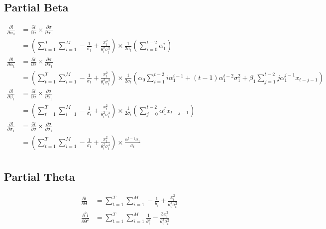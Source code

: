 \documentclass[a4paper, 12pts]{article}
\begin{document}
\subsection{Partial Beta}

\begin{align*}
  \frac{\partial{l}}{\partial{\alpha_0}} &=
  \frac{\partial{l}}{\partial{\sigma}} \times
  \frac{\partial{\sigma}}{\partial{\alpha_0}}\\
  &= \left(\sum_{t = 1}^T \sum_{i = 1}^M -\frac{1}{\sigma_t} +
    \frac{x_t^2}{\theta_i^2 \sigma_t^3}\right) \times
  \frac{1}{2\sigma_t}\left( \sum_{i = 0}^{t-2} \alpha_1^i \right)\\
  \frac{\partial{l}}{\partial{\alpha_1}} &=
  \frac{\partial{l}}{\partial{\sigma}} \times
  \frac{\partial{\sigma}}{\partial{\alpha_1}}\\
  &= \left(\sum_{t = 1}^T \sum_{i = 1}^M -\frac{1}{\sigma_t} +
    \frac{x_t^2}{\theta_i^2 \sigma_t^3}\right) \times
  \frac{1}{2\sigma_t} \left( \alpha_0 \sum_{i = 1}^{t - 2}
    i\alpha_1^{i -1} + (t - 1)\alpha_1^{t - 2} \sigma_1^2 + \beta_1
    \sum_{j = 1}^{t - 2} j \alpha_1^{j - 1} x_{t - j - 1}\right)\\
  \frac{\partial l}{\partial \beta_1} &= \frac{\partial l}{\partial
    \sigma} \times \frac{\partial \sigma}{\partial \beta_1}\\
  &= \left(\sum_{t = 1}^T \sum_{i = 1}^M -\frac{1}{\sigma_t} +
    \frac{x_t^2}{\theta_i^2 \sigma_t^3}\right)\times
  \frac{1}{2\sigma_t} \left(\sum_{j = 0}^{t - 2}
    \alpha_1^j x_{t - j - 1} \right)\\
  \frac{\partial l}{\partial \sigma_1} &= \frac{\partial l}{\partial
    \sigma} \times \frac{\partial \sigma}{\partial \sigma_1}\\
    &= \left(\sum_{t = 1}^T \sum_{i = 1}^M -\frac{1}{\sigma_t} +
      \frac{x_t^2}{\theta_i^2 \sigma_t^3}\right) \times
    \frac{\alpha^{t
        - 1}\sigma_1}{\sigma_t}\\
\end{align*}

\subsection{Partial Theta}

\begin{align*}
\frac{\partial l}{\partial \boldsymbol{\theta}} &= \sum_{t = 1}^T \sum_{i = 1}^M
-\frac{1}{\theta_i} + \frac{x_t^2}{\theta_i^3 \sigma_t^2}\\
\frac{\partial^2 l}{\partial \boldsymbol{\theta}^2} &= \sum_{t = 1}^T \sum_{i = 1}^M
\frac{1}{\theta_i^2} - \frac{3x_t^2}{\theta_i^4 \sigma_t^2}
\end{align*}
\end{document}
